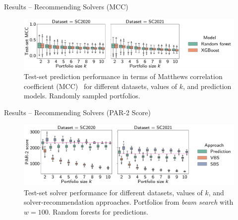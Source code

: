 \documentclass[en]{sdqbeamer}
\begin{document}
\begin{frame}[t]{Results -- Recommending Solvers (MCC)}
	\begin{figure}[htb]
		\centering
		\includegraphics[width=\textwidth]{plots/prediction-test-mcc.pdf}
		\caption*{Test-set prediction performance in terms of Matthews correlation coefficient (MCC)~\cite{matthews1975comparison,gorodkin2004comparing} for different datasets, values of $k$, and prediction models. Randomly sampled portfolios.}
	\end{figure}
\end{frame}

\begin{frame}[t]{Results -- Recommending Solvers (PAR-2 Score)}
	\begin{figure}[htb]
		\centering
		\includegraphics[width=\textwidth]{plots/prediction-test-objective-beam.pdf}
		\caption*{Test-set solver performance for different datasets, values of $k$, and solver-recommendation approaches. Portfolios from \emph{beam search} with $w=100$. Random forests for predictions.}
	\end{figure}
\end{frame}
\end{document}
